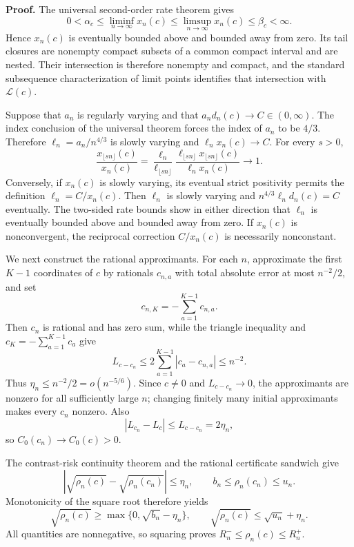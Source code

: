 \textbf{Proof.}
The universal second-order rate theorem gives
\[
 0<\alpha_c\leq\liminf_{n\to\infty}x_n(c)
 \leq\limsup_{n\to\infty}x_n(c)\leq\beta_c<\infty.
\]
Hence \(x_n(c)\) is eventually bounded above and bounded away from zero.  Its tail closures are nonempty compact subsets of a common compact interval and are nested.  Their intersection is therefore nonempty and compact, and the standard subsequence characterization of limit points identifies that intersection with \(\mathcal L(c)\).

Suppose that \(a_n\) is regularly varying and that \(a_nd_n(c)\to C\in(0,\infty)\).  The index conclusion of the universal theorem forces the index of \(a_n\) to be \(4/3\).  Therefore \(\ell_n=a_n/n^{4/3}\) is slowly varying and \(\ell_nx_n(c)\to C\).  For every \(s>0\),
\[
 \frac{x_{\lfloor sn\rfloor}(c)}{x_n(c)}
 =\frac{\ell_n}{\ell_{\lfloor sn\rfloor}}
 \frac{\ell_{\lfloor sn\rfloor}x_{\lfloor sn\rfloor}(c)}
 {\ell_nx_n(c)}\longrightarrow1.
\]
Conversely, if \(x_n(c)\) is slowly varying, its eventual strict positivity permits the definition \(\ell_n=C/x_n(c)\).  Then \(\ell_n\) is slowly varying and \(n^{4/3}\ell_nd_n(c)=C\) eventually.  The two-sided rate bounds show in either direction that \(\ell_n\) is eventually bounded above and bounded away from zero.  If \(x_n(c)\) is nonconvergent, the reciprocal correction \(C/x_n(c)\) is necessarily nonconstant.

We next construct the rational approximants.  For each \(n\), approximate the first \(K-1\) coordinates of \(c\) by rationals \(c_{n,a}\) with total absolute error at most \(n^{-2}/2\), and set
\[
 c_{n,K}=-\sum_{a=1}^{K-1}c_{n,a}.
\]
Then \(c_n\) is rational and has zero sum, while the triangle inequality and \(c_K=-\sum_{a=1}^{K-1}c_a\) give
\[
 L_{c-c_n}\leq
 2\sum_{a=1}^{K-1}|c_a-c_{n,a}|\leq n^{-2}.
\]
Thus \(\eta_n\leq n^{-2}/2=o(n^{-5/6})\).  Since \(c\neq0\) and \(L_{c-c_n}\to0\), the approximants are nonzero for all sufficiently large \(n\); changing finitely many initial approximants makes every \(c_n\) nonzero.  Also
\[
 |L_{c_n}-L_c|\leq L_{c-c_n}=2\eta_n,
\]
so \(C_0(c_n)\to C_0(c)>0\).

The contrast-risk continuity theorem and the rational certificate sandwich give
\[
 \left|\sqrt{\rho_n(c)}-\sqrt{\rho_n(c_n)}\right|\leq\eta_n,
 \qquad
 b_n\leq\rho_n(c_n)\leq u_n.
\]
Monotonicity of the square root therefore yields
\[
 \sqrt{\rho_n(c)}
 \geq\max\{0,\sqrt{b_n}-\eta_n\},
 \qquad
 \sqrt{\rho_n(c)}\leq\sqrt{u_n}+\eta_n.
\]
All quantities are nonnegative, so squaring proves
\(R_n^-\leq\rho_n(c)\leq R_n^+\).


